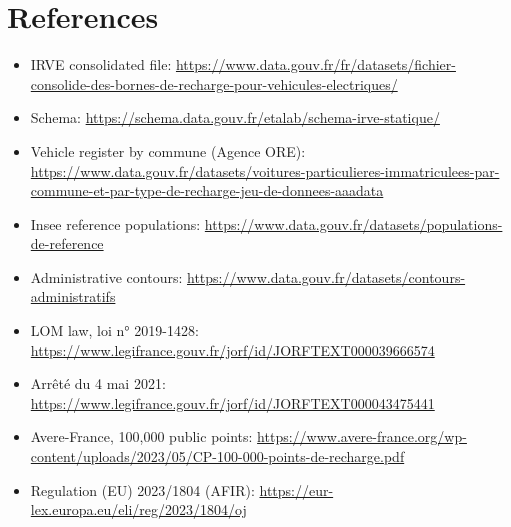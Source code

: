 \documentclass[11pt]{article}
\begin{document}
\section*{References}
\small
\begin{itemize}[leftmargin=*]
  \item IRVE consolidated file: \url{https://www.data.gouv.fr/fr/datasets/fichier-consolide-des-bornes-de-recharge-pour-vehicules-electriques/}
  \item Schema: \url{https://schema.data.gouv.fr/etalab/schema-irve-statique/}
  \item Vehicle register by commune (Agence ORE): \url{https://www.data.gouv.fr/datasets/voitures-particulieres-immatriculees-par-commune-et-par-type-de-recharge-jeu-de-donnees-aaadata}
  \item Insee reference populations: \url{https://www.data.gouv.fr/datasets/populations-de-reference}
  \item Administrative contours: \url{https://www.data.gouv.fr/datasets/contours-administratifs}
  \item LOM law, loi n° 2019-1428: \url{https://www.legifrance.gouv.fr/jorf/id/JORFTEXT000039666574}
  \item Arrêté du 4 mai 2021: \url{https://www.legifrance.gouv.fr/jorf/id/JORFTEXT000043475441}
  \item Avere-France, 100,000 public points: \url{https://www.avere-france.org/wp-content/uploads/2023/05/CP-100-000-points-de-recharge.pdf}
  \item Regulation (EU) 2023/1804 (AFIR): \url{https://eur-lex.europa.eu/eli/reg/2023/1804/oj}
\end{itemize}
\end{document}
